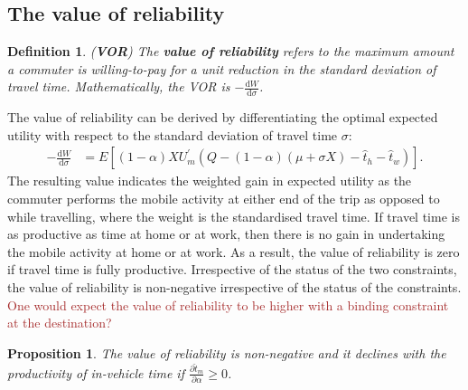 \documentclass[12pt,a4paper,british]{article}
\newtheorem{definition}{Definition}[section]
\newtheorem{prop}{Proposition}[section]
\begin{document}
\subsection*{The value of reliability}
\begin{definition}
(\textbf{VOR}) The \textbf{\textit{value of reliability}} refers to the maximum amount a commuter is willing-to-pay for a unit reduction in the standard deviation of travel time. Mathematically, the VOR is $-\frac{\mathrm{d}W}{\mathrm{d}\sigma}$.
\end{definition}
The value of reliability can be derived by differentiating the optimal expected utility with respect to the standard deviation of travel
time $\sigma$: 
\begin{align*}
-\frac{\mathrm{d}W}{\mathrm{d}\sigma} & =E\left[\left(1-\alpha\right)XU_{m}^{\prime}\left(Q-\left(1-\alpha\right)\left(\mu+\sigma X\right)-\hat{t}_{h}-\hat{t}_{w}\right)\right].
\end{align*}
The resulting value indicates the weighted gain in expected utility as the commuter performs the mobile activity at either end of the trip as opposed to while travelling, where the weight is the standardised travel time. If travel time is as productive as time at home or at work, then there is no gain in undertaking the mobile activity at home or at work. As a result, the value of reliability is zero if travel time is fully productive. Irrespective of the status of the two constraints, the value of reliability is non-negative irrespective of the status of the constraints. \textcolor{brown}{One would expect the value of reliability to be higher with a binding constraint at the destination?} 
\begin{prop}
The value of reliability is non-negative and it declines with the productivity of in-vehicle time if $\frac{\partial\hat{t}_{m}}{\partial\alpha}\geq0$. 
\end{prop}
\end{document}
